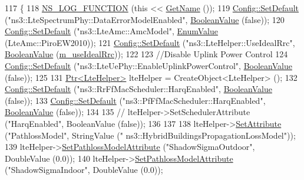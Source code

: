 \begin{DoxyCode}
117 \{
118   \hyperlink{log-macros-disabled_8h_a90b90d5bad1f39cb1b64923ea94c0761}{NS\_LOG\_FUNCTION} (\textcolor{keyword}{this} << \hyperlink{classns3_1_1TestCase_a28f7bb59669c24dae1c290fc17fc9b62}{GetName} ());
119   \hyperlink{group__config_ga2e7882df849d8ba4aaad31c934c40c06}{Config::SetDefault} (\textcolor{stringliteral}{"ns3::LteSpectrumPhy::DataErrorModelEnabled"}, 
      \hyperlink{classns3_1_1BooleanValue}{BooleanValue} (\textcolor{keyword}{false}));
120   \hyperlink{group__config_ga2e7882df849d8ba4aaad31c934c40c06}{Config::SetDefault} (\textcolor{stringliteral}{"ns3::LteAmc::AmcModel"}, \hyperlink{classns3_1_1EnumValue}{EnumValue} (LteAmc::PiroEW2010));
121   \hyperlink{group__config_ga2e7882df849d8ba4aaad31c934c40c06}{Config::SetDefault} (\textcolor{stringliteral}{"ns3::LteHelper::UseIdealRrc"}, 
      \hyperlink{classns3_1_1BooleanValue}{BooleanValue} (\hyperlink{classLenaMimoTestCase_a5bb5c39ff12567b31af7beab7c1caadb}{m\_useIdealRrc}));
122 
123   \textcolor{comment}{//Disable Uplink Power Control}
124   \hyperlink{group__config_ga2e7882df849d8ba4aaad31c934c40c06}{Config::SetDefault} (\textcolor{stringliteral}{"ns3::LteUePhy::EnableUplinkPowerControl"}, 
      \hyperlink{classns3_1_1BooleanValue}{BooleanValue} (\textcolor{keyword}{false}));
125 
131   \hyperlink{classns3_1_1Ptr}{Ptr<LteHelper>} lteHelper = CreateObject<LteHelper> ();
132   \hyperlink{group__config_ga2e7882df849d8ba4aaad31c934c40c06}{Config::SetDefault} (\textcolor{stringliteral}{"ns3::RrFfMacScheduler::HarqEnabled"}, 
      \hyperlink{classns3_1_1BooleanValue}{BooleanValue} (\textcolor{keyword}{false}));
133   \hyperlink{group__config_ga2e7882df849d8ba4aaad31c934c40c06}{Config::SetDefault} (\textcolor{stringliteral}{"ns3::PfFfMacScheduler::HarqEnabled"}, 
      \hyperlink{classns3_1_1BooleanValue}{BooleanValue} (\textcolor{keyword}{false}));
134   
135 \textcolor{comment}{//   lteHelper->SetSchedulerAttribute ("HarqEnabled", BooleanValue (false));}
136   
137   
138   lteHelper->\hyperlink{classns3_1_1ObjectBase_ac60245d3ea4123bbc9b1d391f1f6592f}{SetAttribute} (\textcolor{stringliteral}{"PathlossModel"}, StringValue (\textcolor{stringliteral}{"
      ns3::HybridBuildingsPropagationLossModel"}));
139   lteHelper->\hyperlink{classns3_1_1LteHelper_aa96ebbd6845ca61c2b5e08e84481a348}{SetPathlossModelAttribute} (\textcolor{stringliteral}{"ShadowSigmaOutdoor"}, DoubleValue (0.0));
140   lteHelper->\hyperlink{classns3_1_1LteHelper_aa96ebbd6845ca61c2b5e08e84481a348}{SetPathlossModelAttribute} (\textcolor{stringliteral}{"ShadowSigmaIndoor"}, DoubleValue (0.0));

\end{DoxyCode}
